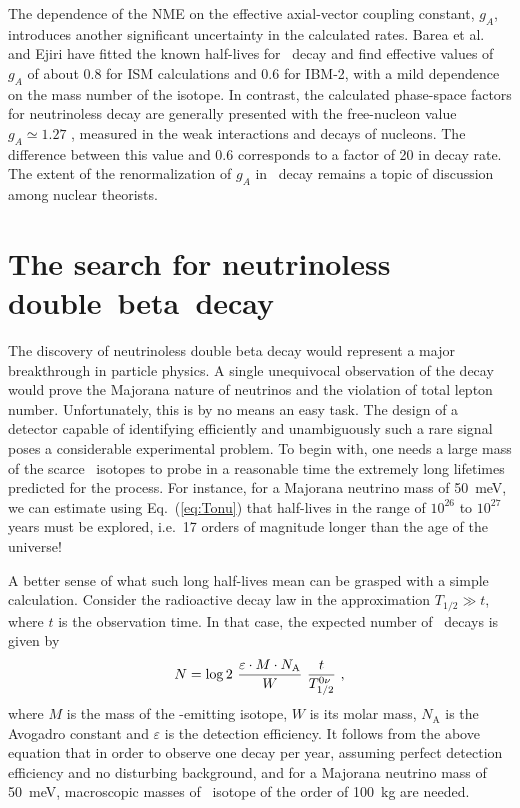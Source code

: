 \documentclass{PoS}
\begin{document}
The dependence of the NME on the effective axial-vector coupling constant, $g_{A}$, introduces another significant uncertainty in the calculated rates. Barea et al.\ \cite{Barea:2013bz} and Ejiri \cite{Ejiri:2010zza} have fitted the known half-lives for \bbtnu\ decay and find effective values of $g_{A}$ of about 0.8 for ISM calculations and 0.6 for IBM-2, with a mild dependence on the mass number of the isotope. In contrast, the calculated phase-space factors for neutrinoless decay are generally presented with the free-nucleon value $g_{A} \simeq1.27$ \cite{Agashe:2014kda}, measured in the weak interactions and decays of nucleons. The difference between this value and 0.6 corresponds to a factor of 20 in decay rate. The extent of the renormalization of $g_{A}$ in \bbonu\ decay remains a topic of discussion among nuclear theorists.
 
\section{The search for neutrinoless \mbox{double beta decay}} 


The discovery of neutrinoless double beta decay would represent a major breakthrough in particle physics. A single unequivocal observation of the decay would prove the Majorana nature of neutrinos and the violation of total lepton number. Unfortunately, this is by no means an easy task. The design of a detector capable of identifying efficiently and unambiguously such a rare signal poses a considerable experimental problem. To begin with, one needs a large mass of the scarce \bb\ isotopes to probe in a reasonable time the extremely long lifetimes predicted for the process. For instance, for a Majorana neutrino mass of 50~meV, we can estimate using Eq.~(\ref{eq:Tonu}) that half-lives in the range of $10^{26}$ to $10^{27}$ years must be explored, i.e.\ 17 orders of magnitude longer than the age of the universe! 

A better sense of what such long half-lives mean can be grasped with a simple calculation. Consider the radioactive decay law in the approximation $T_{1/2}\gg t$, where $t$ is the observation time. In that case, the expected number of \bbonu\ decays is given by
\begin{equation}
N = \log2\ \frac{\varepsilon\cdot M \cdot N_\mathrm{A}}{W}\ \frac{t}{\Tonu}\ , \label{eq:Nbb}
\end{equation}
where $M$ is the mass of the \bb-emitting isotope, $W$ is its molar mass, $N_\mathrm{A}$ is the Avogadro constant and $\varepsilon$ is the detection efficiency. It follows from the above equation that in order to observe one decay per year, assuming perfect detection efficiency and no disturbing background, and for a Majorana neutrino mass of 50~meV, macroscopic masses of \bb\ isotope of the order of 100~kg are needed.
\end{document}
